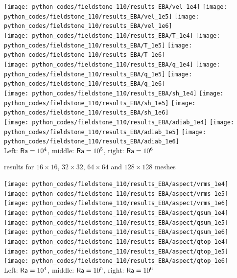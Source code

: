 \begin{center}
\texttt{[image: python\_codes/fieldstone\_110/results\_EBA/vel\_1e4]}
\texttt{[image: python\_codes/fieldstone\_110/results\_EBA/vel\_1e5]}
\texttt{[image: python\_codes/fieldstone\_110/results\_EBA/vel\_1e6]}\\
\texttt{[image: python\_codes/fieldstone\_110/results\_EBA/T\_1e4]}
\texttt{[image: python\_codes/fieldstone\_110/results\_EBA/T\_1e5]}
\texttt{[image: python\_codes/fieldstone\_110/results\_EBA/T\_1e6]}\\
\texttt{[image: python\_codes/fieldstone\_110/results\_EBA/q\_1e4]}
\texttt{[image: python\_codes/fieldstone\_110/results\_EBA/q\_1e5]}
\texttt{[image: python\_codes/fieldstone\_110/results\_EBA/q\_1e6]}\\
\texttt{[image: python\_codes/fieldstone\_110/results\_EBA/sh\_1e4]}
\texttt{[image: python\_codes/fieldstone\_110/results\_EBA/sh\_1e5]}
\texttt{[image: python\_codes/fieldstone\_110/results\_EBA/sh\_1e6]}\\
\texttt{[image: python\_codes/fieldstone\_110/results\_EBA/adiab\_1e4]}
\texttt{[image: python\_codes/fieldstone\_110/results\_EBA/adiab\_1e5]}
\texttt{[image: python\_codes/fieldstone\_110/results\_EBA/adiab\_1e6]}\\
{\captionfont Left: ${\mathsf{Ra}}=10^4$, middle: ${\mathsf{Ra}}=10^5$, right: ${\mathsf{Ra}}=10^6$}
\end{center}

\newpage
\aspect results for $16\times 16$, $32\times 32$, $64\times 64$ and $128\times 128$ meshes

\begin{center}
\texttt{[image: python\_codes/fieldstone\_110/results\_EBA/aspect/vrms\_1e4]}
\texttt{[image: python\_codes/fieldstone\_110/results\_EBA/aspect/vrms\_1e5]}
\texttt{[image: python\_codes/fieldstone\_110/results\_EBA/aspect/vrms\_1e6]}\\
\texttt{[image: python\_codes/fieldstone\_110/results\_EBA/aspect/qsum\_1e4]}
\texttt{[image: python\_codes/fieldstone\_110/results\_EBA/aspect/qsum\_1e5]}
\texttt{[image: python\_codes/fieldstone\_110/results\_EBA/aspect/qsum\_1e6]}\\
\texttt{[image: python\_codes/fieldstone\_110/results\_EBA/aspect/qtop\_1e4]}
\texttt{[image: python\_codes/fieldstone\_110/results\_EBA/aspect/qtop\_1e5]}
\texttt{[image: python\_codes/fieldstone\_110/results\_EBA/aspect/qtop\_1e6]}\\
{\captionfont Left: ${\mathsf{Ra}}=10^4$, middle: ${\mathsf{Ra}}=10^5$, right: ${\mathsf{Ra}}=10^6$} 
\end{center}

